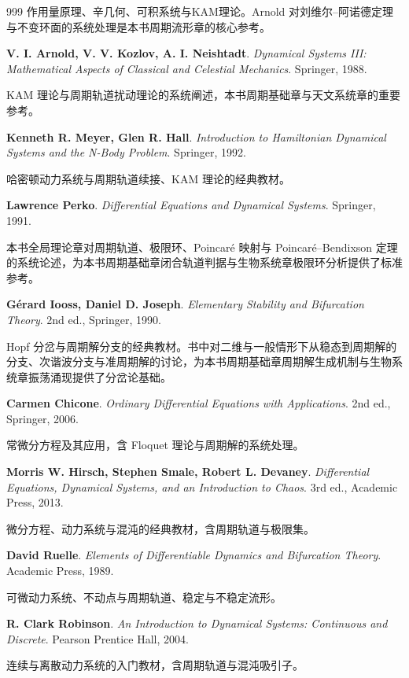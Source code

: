 \begin{thebibliography}{999}
作用量原理、辛几何、可积系统与KAM理论。Arnold 对刘维尔–阿诺德定理与不变环面的系统处理是本书周期流形章的核心参考。

 \textbf{V. I. Arnold, V. V. Kozlov, A. I. Neishtadt}. \textit{Dynamical Systems III: Mathematical Aspects of Classical and Celestial Mechanics}. Springer, 1988.

KAM 理论与周期轨道扰动理论的系统阐述，本书周期基础章与天文系统章的重要参考。

 \textbf{Kenneth R. Meyer, Glen R. Hall}. \textit{Introduction to Hamiltonian Dynamical Systems and the N-Body Problem}. Springer, 1992.

哈密顿动力系统与周期轨道续接、KAM 理论的经典教材。

 \textbf{Lawrence Perko}. \textit{Differential Equations and Dynamical Systems}. Springer, 1991.

本书全局理论章对周期轨道、极限环、Poincaré 映射与 Poincaré–Bendixson 定理的系统论述，为本书周期基础章闭合轨道判据与生物系统章极限环分析提供了标准参考。

 \textbf{G\'erard Iooss, Daniel D. Joseph}. \textit{Elementary Stability and Bifurcation Theory}. 2nd ed., Springer, 1990.

Hopf 分岔与周期解分支的经典教材。书中对二维与一般情形下从稳态到周期解的分支、次谐波分支与准周期解的讨论，为本书周期基础章周期解生成机制与生物系统章振荡涌现提供了分岔论基础。

 \textbf{Carmen Chicone}. \textit{Ordinary Differential Equations with Applications}. 2nd ed., Springer, 2006.

常微分方程及其应用，含 Floquet 理论与周期解的系统处理。

 \textbf{Morris W. Hirsch, Stephen Smale, Robert L. Devaney}. \textit{Differential Equations, Dynamical Systems, and an Introduction to Chaos}. 3rd ed., Academic Press, 2013.

微分方程、动力系统与混沌的经典教材，含周期轨道与极限集。

 \textbf{David Ruelle}. \textit{Elements of Differentiable Dynamics and Bifurcation Theory}. Academic Press, 1989.

可微动力系统、不动点与周期轨道、稳定与不稳定流形。

 \textbf{R. Clark Robinson}. \textit{An Introduction to Dynamical Systems: Continuous and Discrete}. Pearson Prentice Hall, 2004.

连续与离散动力系统的入门教材，含周期轨道与混沌吸引子。


\end{thebibliography}

